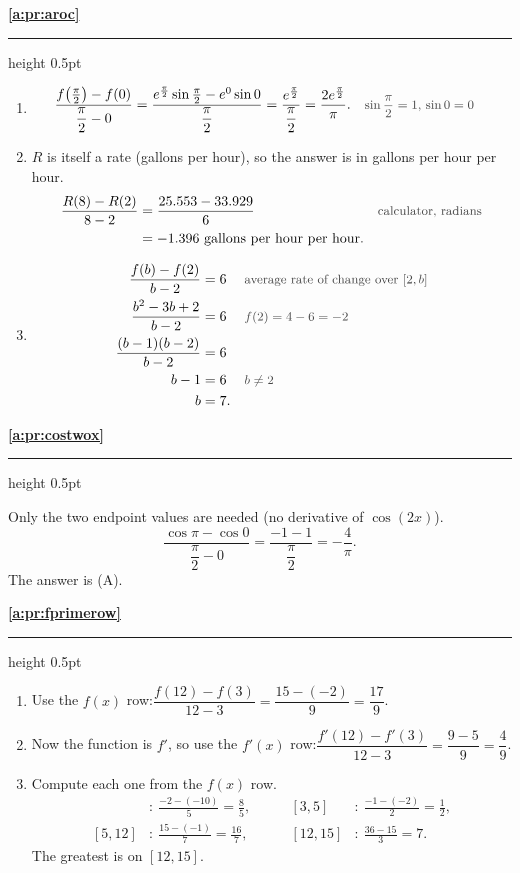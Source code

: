 \documentclass[11pt,a4paper]{article}
\newcommand{\solitem}[2]{%
 \par\addvspace{16pt}\Needspace{10\baselineskip}%
 {\large\bfseries \ref{#1}}\par\nobreak\vspace{2pt}%
 {\color{rulegray}\hrule height 0.5pt}\nobreak\vspace{7pt}%
 #2\par}
\newcommand{\why}[1]{\text{\small\color{darkgray}#1}}
\begin{document}
\solitem{a:pr:aroc}{%
\begin{enumerate}[label=(\alph*)]
 \item
 \begin{align*}
 \frac{f\bigl(\frac{\pi}{2}\bigr)-f(0)}{\dfrac{\pi}{2}-0}&=\frac{e^{\frac{\pi}{2}}\sin\frac{\pi}{2}-e^0\sin0}{\dfrac{\pi}{2}}=\frac{e^{\frac{\pi}{2}}}{\dfrac{\pi}{2}}=\frac{2e^{\frac{\pi}{2}}}{\pi}. &&\why{$\sin\frac{\pi}{2}=1$, $\sin0=0$}
 \end{align*}
 \item $R$ is itself a rate (gallons per hour), so the answer is in gallons per hour per hour.
 \begin{align*}
 \frac{R(8)-R(2)}{8-2}&=\frac{25.553-33.929}{6} &&\why{calculator, radians}\\
 &=-1.396\text{ gallons per hour per hour}.
 \end{align*}
 \item
 \begin{align*}
 \frac{f(b)-f(2)}{b-2}&=6 &&\why{average rate of change over $[2,b]$}\\
 \frac{b^2-3b+2}{b-2}&=6 &&\why{$f(2)=4-6=-2$}\\
 \frac{(b-1)(b-2)}{b-2}&=6\\
 b-1&=6 &&\why{$b\ne2$}\\
 b&=7.
 \end{align*}
\end{enumerate}
}

\solitem{a:pr:costwox}{%
Only the two endpoint values are needed (no derivative of $\cos(2x)$).
\[
\frac{\cos\pi-\cos0}{\dfrac{\pi}{2}-0}=\frac{-1-1}{\dfrac{\pi}{2}}=-\frac{4}{\pi}.
\]
The answer is (A).
}

\solitem{a:pr:fprimerow}{%
\begin{enumerate}[label=(\alph*)]
 \item Use the $f(x)$ row:\quad $\dfrac{f(12)-f(3)}{12-3}=\dfrac{15-(-2)}{9}=\dfrac{17}{9}$.
 \item Now the function is $f'$, so use the $f'(x)$ row:\quad $\dfrac{f'(12)-f'(3)}{12-3}=\dfrac{9-5}{9}=\dfrac49$.
 \item Compute each one from the $f(x)$ row.
 \begin{align*}
 [-2,3]&:\ \frac{-2-(-10)}{5}=\frac85, &\qquad [3,5]&:\ \frac{-1-(-2)}{2}=\frac12,\\
 [5,12]&:\ \frac{15-(-1)}{7}=\frac{16}{7}, &\qquad [12,15]&:\ \frac{36-15}{3}=7.
 \end{align*}
 The greatest is on $[12,15]$.
\end{enumerate}
}
\end{document}
